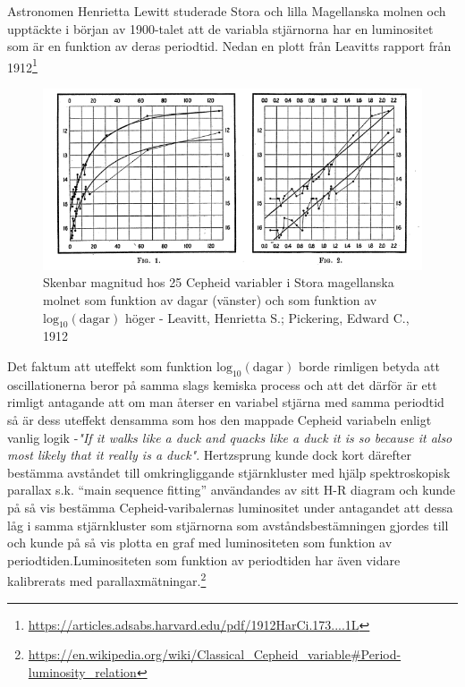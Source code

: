 \documentclass[./exercises.tex]{subfiles}
\begin{document}
Astronomen Henrietta Lewitt studerade Stora och lilla Magellanska molnen och upptäckte i början av 1900-talet att de variabla stjärnorna 
har en luminositet som är en funktion av deras periodtid.
Nedan en plott från Leavitts rapport från 1912\footnote{\url{https://articles.adsabs.harvard.edu/pdf/1912HarCi.173....1L}}

\begin{figure}[H]
\begin{center}
  \includegraphics[width=\linewidth]{Henrietta.png}
  \caption{Skenbar magnitud hos 25 Cepheid variabler i Stora magellanska molnet som funktion av dagar (vänster) och som funktion av $\text{log}_{10}(\text{dagar})$ höger -
    Leavitt, Henrietta S.; Pickering, Edward C., 1912 }
  \end{center}
  \label{fig4}
\end{figure}
Det faktum att uteffekt som funktion $\text{log}_{10}(\text{dagar})$ borde rimligen betyda att oscillationerna
beror på samma slags kemiska process och att det därför är ett rimligt antagande att om man återser
en variabel stjärna med samma periodtid så är dess uteffekt densamma som hos den mappade Cepheid variabeln enligt
vanlig logik -\textit{"If it walks like a duck and quacks like a duck it is so because it also most likely that it really is a duck"}.
Hertzsprung kunde dock kort därefter bestämma avståndet till omkringliggande stjärnkluster med hjälp
spektroskopisk parallax s.k. ``main sequence fitting'' användandes av sitt H-R diagram och kunde på så vis
bestämma Cepheid-varibalernas luminositet under antagandet att dessa låg i samma stjärnkluster som stjärnorna
som avståndsbestämningen gjordes till och kunde på så vis plotta en graf med luminositeten som funktion
av periodtiden.Luminositeten som funktion av periodtiden har även vidare kalibrerats med parallaxmätningar.\footnote{\url{https://en.wikipedia.org/wiki/Classical_Cepheid_variable\#Period-luminosity_relation}}
\end{document}
